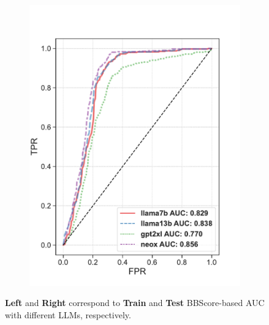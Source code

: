 \documentclass[letterpaper]{article} %
\begin{document}
\begin{figure}[ht]
\begin{subfigure}[b]{0.48\linewidth}
\includegraphics[width=\linewidth,trim={0cm 0.8cm 1cm 1cm},clip]{pictures/AI_AUCtest.pdf}
\label{ai_auc_test}
\end{subfigure}
\vspace{-1cm}
\caption{\textbf{Left} and \textbf{Right} correspond to \textbf{Train} and \textbf{Test} BBScore-based AUC with different LLMs, respectively.}
\label{ai_auc}
\end{figure}
\end{document}
